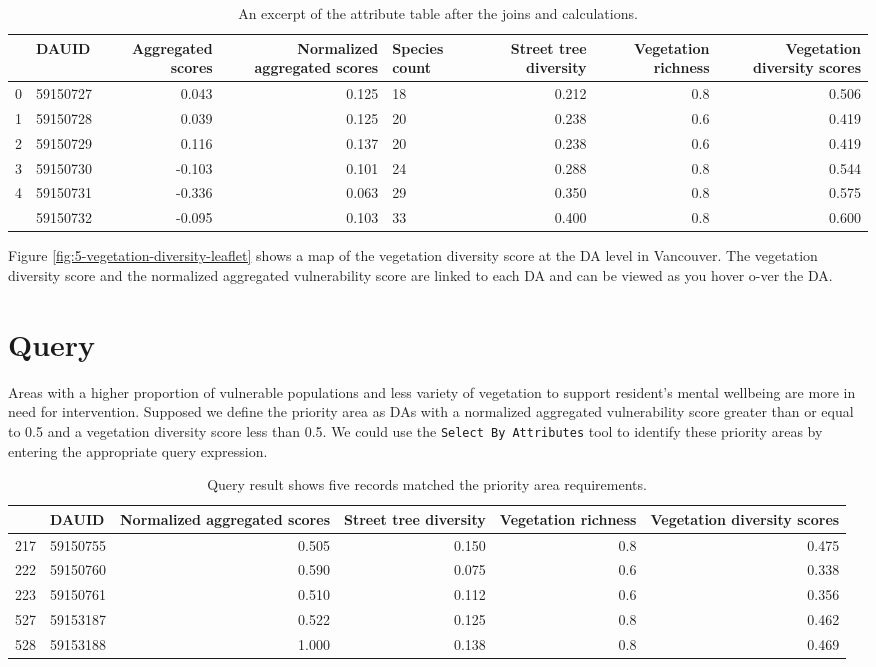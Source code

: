\documentclass[
]{book}
\begin{document}
\begin{table}

\caption{\label{tab:5-case-study-6}An excerpt of the attribute table after the joins and calculations.}
\centering
\begin{tabular}[t]{llrrlrrr}
\toprule
  & DAUID & Aggregated scores & Normalized aggregated scores & Species count & Street tree diversity & Vegetation richness & Vegetation diversity scores\\
\midrule
0 & 59150727 & 0.043 & 0.125 & 18 & 0.212 & 0.8 & 0.506\\
1 & 59150728 & 0.039 & 0.125 & 20 & 0.238 & 0.6 & 0.419\\
2 & 59150729 & 0.116 & 0.137 & 20 & 0.238 & 0.6 & 0.419\\
3 & 59150730 & -0.103 & 0.101 & 24 & 0.288 & 0.8 & 0.544\\
4 & 59150731 & -0.336 & 0.063 & 29 & 0.350 & 0.8 & 0.575\\
\addlinespace
5 & 59150732 & -0.095 & 0.103 & 33 & 0.400 & 0.8 & 0.600\\
\bottomrule
\end{tabular}
\end{table}

Figure \ref{fig:5-vegetation-diversity-leaflet} shows a map of the vegetation diversity score at the DA level in Vancouver. The vegetation diversity score and the normalized aggregated vulnerability score are linked to each DA and can be viewed as you hover o-ver the DA.

\hypertarget{query}{%
\section{Query}\label{query}}

Areas with a higher proportion of vulnerable populations and less variety of vegetation to support resident's mental wellbeing are more in need for intervention. Supposed we define the priority area as DAs with a normalized aggregated vulnerability score greater than or equal to 0.5 and a vegetation diversity score less than 0.5. We could use the \texttt{Select\ By\ Attributes} tool to identify these priority areas by entering the appropriate query expression.

\begin{table}

\caption{\label{tab:5-case-study-9}Query result shows five records matched the priority area requirements.}
\centering
\begin{tabular}[t]{llrrrr}
\toprule
  & DAUID & Normalized aggregated scores & Street tree diversity & Vegetation richness & Vegetation diversity scores\\
\midrule
217 & 59150755 & 0.505 & 0.150 & 0.8 & 0.475\\
222 & 59150760 & 0.590 & 0.075 & 0.6 & 0.338\\
223 & 59150761 & 0.510 & 0.112 & 0.6 & 0.356\\
527 & 59153187 & 0.522 & 0.125 & 0.8 & 0.462\\
528 & 59153188 & 1.000 & 0.138 & 0.8 & 0.469\\
\bottomrule
\end{tabular}
\end{table}
\end{document}
